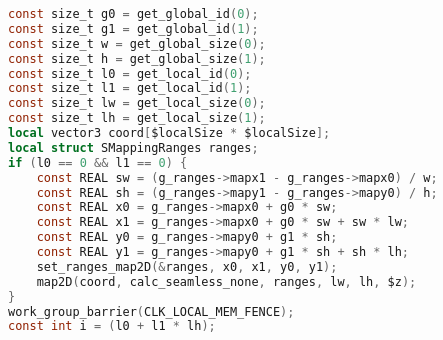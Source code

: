 \begin{lstlisting}[caption={Kernel Example},label={lst:insert_local_map_range},language=OpenCL]
const size_t g0 = get_global_id(0);
const size_t g1 = get_global_id(1);
const size_t w = get_global_size(0);
const size_t h = get_global_size(1);
const size_t l0 = get_local_id(0);
const size_t l1 = get_local_id(1);
const size_t lw = get_local_size(0);
const size_t lh = get_local_size(1);
local vector3 coord[$localSize * $localSize];
local struct SMappingRanges ranges;
if (l0 == 0 && l1 == 0) {
    const REAL sw = (g_ranges->mapx1 - g_ranges->mapx0) / w;
    const REAL sh = (g_ranges->mapy1 - g_ranges->mapy0) / h;
    const REAL x0 = g_ranges->mapx0 + g0 * sw;
    const REAL x1 = g_ranges->mapx0 + g0 * sw + sw * lw;
    const REAL y0 = g_ranges->mapy0 + g1 * sh;
    const REAL y1 = g_ranges->mapy0 + g1 * sh + sh * lh;
    set_ranges_map2D(&ranges, x0, x1, y0, y1);
    map2D(coord, calc_seamless_none, ranges, lw, lh, $z);
}
work_group_barrier(CLK_LOCAL_MEM_FENCE);
const int i = (l0 + l1 * lh);
\end{lstlisting}
